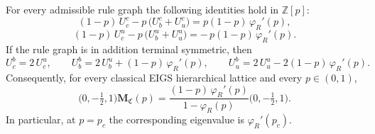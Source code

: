 \begin{lemma}\label{lem:exact-row-identities}\label{lem:conditional-pivotal-counts}\label{prop:universal-eigenvectors}
For every admissible rule graph the following identities hold in $\mathbb Z[p]$:
\[
   (1-p)\,U^{c}_{c}-p\,\bigl(U^{c}_{b}+U^{c}_{u}\bigr)=p(1-p)\,\varphi_R'(p),
\]
\[
   (1-p)\,U^{u}_{c}-p\,\bigl(U^{u}_{b}+U^{u}_{u}\bigr)=-\,p(1-p)\,\varphi_R'(p).
\]
If the rule graph is in addition terminal symmetric, then
\[
   U^{b}_{c}=2\,U^{u}_{c},
   \qquad
   U^{b}_{b}=2\,U^{u}_{b}+(1-p)\,\varphi_R'(p),
   \qquad
   U^{b}_{u}=2\,U^{u}_{u}-2(1-p)\,\varphi_R'(p).
\]
Consequently, for every classical EIGS hierarchical lattice and every $p\in(0,1)$,
\[
 \bigl(0,-\tfrac12,1\bigr)\mathbf M_{\mathfrak C}(p)
 =\frac{(1-p)\,\varphi_R'(p)}{1-\varphi_R(p)}
 \bigl(0,-\tfrac12,1\bigr).
\]
In particular, at $p=p_c$ the corresponding eigenvalue is $\varphi_R'(p_c)$.
\end{lemma}

